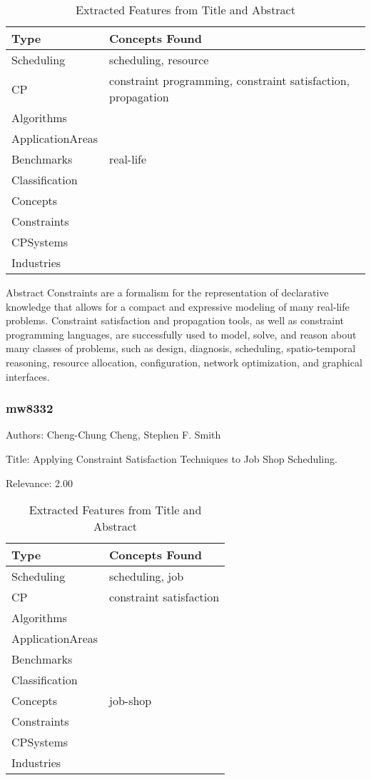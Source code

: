 {\scriptsize
\begin{longtable}{p{2cm}p{20cm}}
\caption{Extracted Features from Title and Abstract}\\ \toprule
Type & Concepts Found\\ \midrule
\endhead
\bottomrule
\endfoot
Scheduling & scheduling, resource\\ 
CP & constraint programming, constraint satisfaction, propagation\\ 
Algorithms & \\ 
ApplicationAreas & \\ 
Benchmarks & real-life\\ 
Classification & \\ 
Concepts & \\ 
Constraints & \\ 
CPSystems & \\ 
Industries & \\ 
\end{longtable}
}

 Abstract 
           Constraints are a formalism for the representation of declarative knowledge that allows for a compact and expressive modeling of many real‐life problems. Constraint satisfaction and propagation tools, as well as constraint programming languages, are successfully used to model, solve, and reason about many classes of problems, such as design, diagnosis, scheduling, spatio‐temporal reasoning, resource allocation, configuration, network optimization, and graphical interfaces. 

\subsubsection{mw8332}
\label{mw:mw8332}

Authors: Cheng-Chung Cheng, Stephen F. Smith

Title: Applying Constraint Satisfaction Techniques to Job Shop Scheduling.

Relevance:  2.00

{\scriptsize
\begin{longtable}{p{2cm}p{20cm}}
\caption{Extracted Features from Title and Abstract}\\ \toprule
Type & Concepts Found\\ \midrule
\endhead
\bottomrule
\endfoot
Scheduling & scheduling, job\\ 
CP & constraint satisfaction\\ 
Algorithms & \\ 
ApplicationAreas & \\ 
Benchmarks & \\ 
Classification & \\ 
Concepts & job-shop\\ 
Constraints & \\ 
CPSystems & \\ 
Industries & \\ 
\end{longtable}
}




